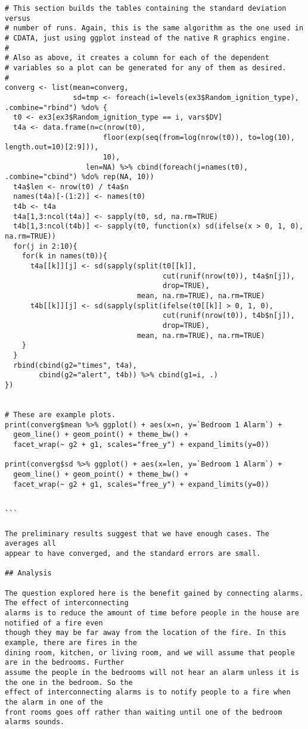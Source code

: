 \begin{lstlisting}[basicstyle=\scriptsize]
# This section builds the tables containing the standard deviation versus
# number of runs. Again, this is the same algorithm as the one used in
# CDATA, just using ggplot instead of the native R graphics engine.
#
# Also as above, it creates a column for each of the dependent
# variables so a plot can be generated for any of them as desired.
#
converg <- list(mean=converg,
                sd=tmp <- foreach(i=levels(ex3$Random_ignition_type), .combine="rbind") %do% {
  t0 <- ex3[ex3$Random_ignition_type == i, vars$DV]
  t4a <- data.frame(n=c(nrow(t0),
                       floor(exp(seq(from=log(nrow(t0)), to=log(10), length.out=10)[2:9])),
                       10),
                   len=NA) %>% cbind(foreach(j=names(t0), .combine="cbind") %do% rep(NA, 10))
  t4a$len <- nrow(t0) / t4a$n
  names(t4a)[-(1:2)] <- names(t0)
  t4b <- t4a
  t4a[1,3:ncol(t4a)] <- sapply(t0, sd, na.rm=TRUE)
  t4b[1,3:ncol(t4b)] <- sapply(t0, function(x) sd(ifelse(x > 0, 1, 0), na.rm=TRUE))
  for(j in 2:10){
    for(k in names(t0)){
      t4a[[k]][j] <- sd(sapply(split(t0[[k]],
                                     cut(runif(nrow(t0)), t4a$n[j]),
                                     drop=TRUE),
                               mean, na.rm=TRUE), na.rm=TRUE)
      t4b[[k]][j] <- sd(sapply(split(ifelse(t0[[k]] > 0, 1, 0),
                                     cut(runif(nrow(t0)), t4b$n[j]),
                                     drop=TRUE),
                               mean, na.rm=TRUE), na.rm=TRUE)
    }
  }
  rbind(cbind(g2="times", t4a),
        cbind(g2="alert", t4b)) %>% cbind(g1=i, .)
})


# These are example plots.
print(converg$mean %>% ggplot() + aes(x=n, y=`Bedroom 1 Alarm`) +
  geom_line() + geom_point() + theme_bw() +
  facet_wrap(~ g2 + g1, scales="free_y") + expand_limits(y=0))

print(converg$sd %>% ggplot() + aes(x=len, y=`Bedroom 1 Alarm`) +
  geom_line() + geom_point() + theme_bw() +
  facet_wrap(~ g2 + g1, scales="free_y") + expand_limits(y=0))


```

The preliminary results suggest that we have enough cases. The averages all
appear to have converged, and the standard errors are small.

## Analysis

The question explored here is the benefit gained by connecting alarms. The effect of interconnecting
alarms is to reduce the amount of time before people in the house are notified of a fire even
though they may be far away from the location of the fire. In this example, there are fires in the
dining room, kitchen, or living room, and we will assume that people are in the bedrooms. Further
assume the people in the bedrooms will not hear an alarm unless it is the one in the bedroom. So the
effect of interconnecting alarms is to notify people to a fire when the alarm in one of the
front rooms goes off rather than waiting until one of the bedroom alarms sounds.


\end{lstlisting}
